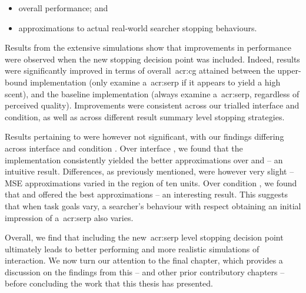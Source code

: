 \begin{itemize}
    \item{ overall performance; and}
    \item{ approximations to actual real-world searcher stopping behaviours.}
\end{itemize}

Results from the extensive simulations show that improvements in performance were observed when the new stopping decision point was included. Indeed, results were significantly improved in terms of overall~\gls{acr:cg} attained between the upper-bound  implementation (only examine a~\gls{acr:serp} if it appears to yield a high scent), and the baseline  implementation (always examine a~\gls{acr:serp}, regardless of perceived quality). Improvements were consistent across our trialled interface and condition, as well as across different result summary level stopping strategies.

Results pertaining to  were however not significant, with our findings differing across interface  and condition . Over interface , we found that the  implementation consistently yielded the better approximations over  and  -- an intuitive result. Differences, as previously mentioned, were however very slight -- MSE approximations varied in the region of ten units. Over condition , we found that  and  offered the best approximations -- an interesting result. This suggests that when task goals vary, a searcher's behaviour with respect obtaining an initial impression of a~\gls{acr:serp} also varies.

Overall, we find that including the new~\gls{acr:serp} level stopping decision point ultimately leads to better performing and more realistic simulations of interaction. We now turn our attention to the final chapter, which provides a discussion on the findings from this -- and other prior contributory chapters -- before concluding the work that this thesis has presented.